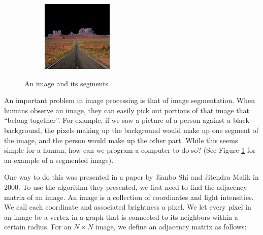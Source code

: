 \begin{figure}
\begin{subfigure}{0.31\textwidth}
    \end{subfigure}
    \hspace*{\fill}
    \begin{subfigure}{0.31\textwidth}
        \includegraphics[width=\textwidth]{PosMon.png}
    \end{subfigure}
    
\caption{An image and its segments.}
\label{fig:monument}
\end{figure}

An important problem in image processing is that of image segmentation.
When humans observe an image, they can easily pick out portions of that image that ``belong together''.
For example, if we saw a picture of a person against a black background, the pixels making up the background would make up one segment of the image, and the person would make up the other part.
While this seems simple for a human, how can we program a computer to do so? (See Figure \ref{fig:monument} for an example of a segmented image).

One way to do this was presented in a paper by Jianbo Shi and Jitendra Malik in 2000. To use the algorithm they presented, we first need to find the adjacency matrix of an image.
An image is a collection of coordinates and light intensities.
We call each coordinate and associated brightness a pixel.
We let every pixel in an image be a vertex in a graph that is connected to its neighbors within a certain radius.
For an $N \times N$ image, we define an adjacency matrix as follows:

